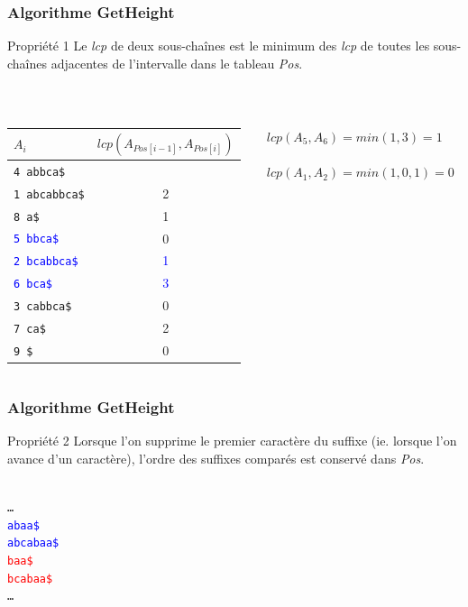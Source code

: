 \documentclass[10pt]{beamer}
\begin{document}
\begin{frame}
  \frametitle{Algorithme GetHeight}

  \begin{block}{Propriété 1}
  Le \textit{lcp} de deux sous-chaînes est le minimum des \textit{lcp} de
  toutes les sous-chaînes adjacentes de l'intervalle dans le tableau
  \textit{Pos}.
  \end{block}
  \hfill \\

  \begin{columns}
    \begin{column}{.48\textwidth}
    \scriptsize
    \begin{tabular}{lc}
      $A_{i}$ & $\mathit{lcp}(A_{\mathit{Pos}[i-1]}, A_{\mathit{Pos}[i]})$\\
      \hline
      \texttt{4 abbca\$}                      & \\
      \texttt{1 abcabbca\$}                   & 2\\
      \texttt{8 a\$}                          & 1\\
      \texttt{\textcolor{blue}{5 bbca\$}}     & 0\\
      \texttt{\textcolor{blue}{2 bcabbca\$}}  & \textcolor{blue}{1}\\
      \texttt{\textcolor{blue}{6 bca\$}}      & \textcolor{blue}{3}\\
      \texttt{3 cabbca\$}                     & 0\\
      \texttt{7 ca\$}                         & 2\\
      \texttt{9 \$}                           & 0\\
    \end{tabular}
    \normalsize
    \end{column}
    \begin{column}{.48\textwidth}
    $\mathit{lcp}(A_{5}, A_{6}) = \mathit{min}(1, 3) = 1$\\ \hfill \\

    $\mathit{lcp}(A_{1}, A_{2}) = \mathit{min}(1, 0, 1) = 0$
    \end{column}
  \end{columns}
\end{frame}

\begin{frame}
  \frametitle{Algorithme GetHeight}

  \begin{block}{Propriété 2}
  Lorsque l'on supprime le premier caractère du suffixe (ie. lorsque l'on
  avance d'un caractère), l'ordre des suffixes comparés est conservé dans
  \textit{Pos}.
  \end{block}
  \hfill \\

  \texttt{\ldots\\
  \textcolor{blue}{abaa\$}\\
  \textcolor{blue}{abcabaa\$}\\
  \textcolor{red}{baa\$}\\
  \textcolor{red}{bcabaa\$}\\
  \ldots}\\
\end{frame}
\end{document}
